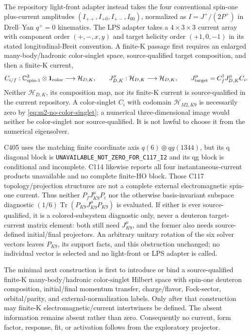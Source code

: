 \documentclass[11pt,oneside]{book}
\begin{document}
The repository light-front adapter instead takes the four conventional
spin-one plus-current amplitudes $(I_{++},I_{+0},I_{+-},I_{00})$, normalized
as $I=J^+/(2P^+)$ in Drell--Yan $q^+=0$ kinematics. The LPS adapter takes a
$4\times3\times3$ current array with component order $(+,-,x,y)$ and target
helicity order $(+1,0,-1)$ in its stated longitudinal-Breit convention. A
finite-K passage first requires an enlarged many-body/hadronic color-singlet
space, source-qualified target composition, and then a finite-K current,
\begin{equation}
 C_{i/f}:\mathbb C^3_{\rm spin\text{-}1}\otimes\mathbf1_{\rm color}
 \longrightarrow\mathcal H_{D,K},
 \qquad J_{D,K}^\mu:\mathcal H_{D,K}\longrightarrow\mathcal H_{D,K},
 \qquad J_{\rm target}^\mu=C_f^\dagger J_{D,K}^\mu C_i.
 \label{eq:m2-target-current-map}
\end{equation}
Neither $\mathcal H_{D,K}$, its composition map, nor its finite-K current is
source-qualified in the current repository. A color-singlet $C_i$ with
codomain $\mathcal H_{M2,K9}$ is necessarily zero by
\cref{eq:m2-no-color-singlet}; a numerical three-dimensional image would
neither be color-singlet nor source-qualified. It is not lawful to choose it
from the numerical eigensolver.

C405 uses the matching finite coordinate axis $q(6)\oplus qg(1344)$, but its
q diagonal block is \texttt{UNAVAILABLE\_NOT\_ZERO\_FOR\_C117\_I2} and its
qg block is conditional and incomplete. C114 likewise reports all four
instantaneous-current products unavailable and no complete finite-HO block.
Those C117 topology/projection structures are not a complete external
electromagnetic spin-one current. Thus neither
$P_fJ_{K9}^\mu P_i$ nor the otherwise basis-invariant subspace diagnostic
$(1/6)\operatorname{Tr}(P_{K9}J_{K9}^\mu P_{K9})$ is evaluated. If either is
ever source-qualified, it is a colored-subsystem diagnostic only, never a
deuteron target-current matrix element: both still need $J_{K9}^\mu$, and the
former also needs source-defined initial/final projectors. An arbitrary
unitary rotation of the six solver vectors leaves $P_{K9}$, its support facts,
and this obstruction unchanged; no individual vector is selected and no
light-front or LPS adapter is called.

The minimal next construction is first to introduce or bind a
source-qualified finite-K many-body/hadronic color-singlet Hilbert space with
spin-one deuteron composition, initial/final momentum transfer, charge/flavor,
Fock-sector, orbital/parity, and external-normalization labels. Only after
that construction may finite-K electromagnetic/current intertwiners be
defined. The absent information remains absent rather than zero. Consequently
no current, form factor, response, fit, or activation follows from the
exploratory projector.
\end{document}
